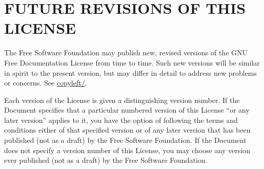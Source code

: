 \section{FUTURE REVISIONS OF THIS LICENSE}
The Free Software Foundation may publish new, revised versions of the GNU Free Documentation
License from time to time. Such new versions will be similar in spirit to the present version,
but may differ in detail to address new problems or concerns.
See \href{http://www.gnu.org/copyleft/}{\scalebox{0.96}{http://www.gnu.org/}\allowbreak copyleft/}.

Each version of the License is given a distinguishing version number. If the Document
specifies that a particular numbered version of this License ``or any later version'' applies to it,
you have the option of following the terms and conditions either of that specified version or of
any later version that has been published (not as a draft) by the Free Software Foundation. If
the Document does not specify a version number of this License, you may choose any version
ever published (not as a draft) by the Free Software Foundation.



